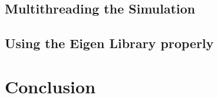 \documentclass[letterpaper, 10 pt, conference]{ieeeconf}  %
\begin{document}
\subsection{Multithreading the Simulation}

\subsection{Using the Eigen Library properly}


\section{Conclusion}



\addtolength{\textheight}{-12cm}   %




\end{document}
